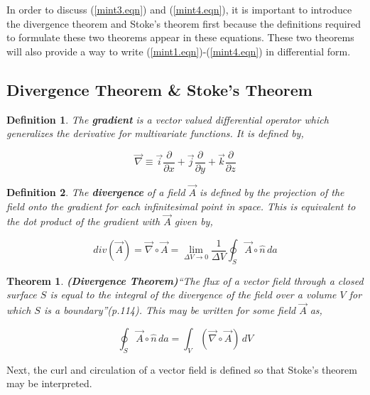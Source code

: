\documentclass[12pt]{article}
\newtheorem{theorem}{Theorem}[section]
\newtheorem{definition}{Definition}[section]
\theoremstyle{definition}
\numberwithin{equation}{section}
\begin{document}
In order to discuss (\ref{mint3.eqn}) and (\ref{mint4.eqn}),  it is important to introduce the divergence theorem and Stoke's theorem first because the definitions required to formulate these two theorems appear in these equations. These two theorems will also provide a way to write (\ref{mint1.eqn})-(\ref{mint4.eqn}) in differential form.

\subsection{Divergence Theorem \& Stoke's Theorem}

\begin{definition} The \textbf{gradient} is a vector valued differential operator which generalizes the derivative for multivariate functions. It is defined by,

\begin{equation}
\vec{\nabla}\equiv\vec{i}\frac{\partial}{\partial x}+\vec{j}\frac{\partial}{\partial y}+\vec{k}\frac{\partial}{\partial z}
\label{grad.eqn}
\end{equation}
\end{definition}


\begin{definition}The \textbf{divergence} of a field $\vec{A}$ is defined by the projection of the field onto the gradient for each infinitesimal point in space. This is equivalent to the dot product of the gradient with $\vec{A}$ given by,

\begin{equation}
div(\vec{A})=\vec{\nabla}\circ\vec{A}=\lim_{\Delta V\to 0}\frac{1}{\Delta V}\oint_{S}\vec{A}\circ\hat{n}\,da
\label{diver.eqn}
\end{equation}
\end{definition}

\begin{theorem}\textbf{(Divergence Theorem)}\enquote{The flux of a vector field through a closed surface $S$ is equal to the integral of the divergence of the field over a volume $V$ for which $S$ is a boundary}(p.114)\cite{Flei}. This may be written for some field $\vec{A}$ as,
\label{divthm}

\begin{equation}
\oint_{S}\vec{A}\circ\hat{n}\,da = \int_{V}(\vec{\nabla}\circ\vec{A})\,dV
\label{divthm.eqn}
\end{equation}
\end{theorem}

Next, the curl and circulation of a vector field is defined so that Stoke's theorem may be interpreted.
\end{document}
